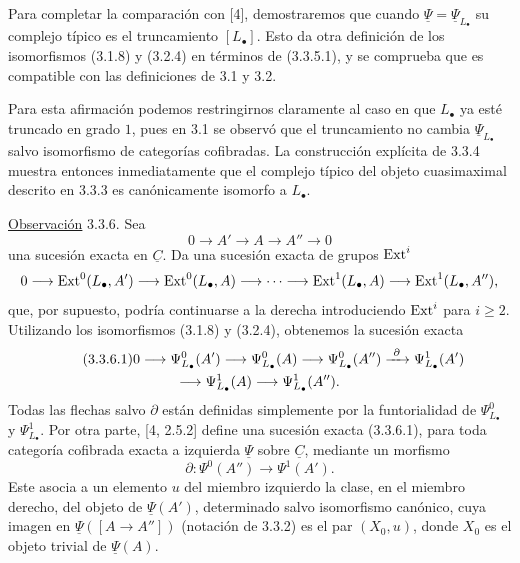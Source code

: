 Para completar la comparación con [4], demostraremos que cuando
$\underline\Psi=\underline\Psi_{L_\bullet}$ su complejo típico es el
truncamiento $[L_\bullet]$. Esto da otra definición de los
isomorfismos (3.1.8) y (3.2.4) en términos de (3.3.5.1), y se comprueba
que es compatible con las definiciones de 3.1 y 3.2.

Para esta afirmación podemos restringirnos claramente al caso en que
$L_\bullet$ ya esté truncado en grado $1$, pues en 3.1 se observó que
el truncamiento no cambia $\underline\Psi_{L_\bullet}$ salvo
isomorfismo de categorías cofibradas. La construcción explícita de
3.3.4 muestra entonces inmediatamente que el complejo típico del
objeto cuasimaximal descrito en 3.3.3 es canónicamente isomorfo a
$L_\bullet$.

\underline{Observación} 3.3.6. Sea
\[
 0\longrightarrow A'\longrightarrow A\longrightarrow A''
 \longrightarrow0
\]
una sucesión exacta en $\underline C$. Da una sucesión exacta de
grupos $\Ext^i$
\[
 0\longrightarrow\Ext^0(L_\bullet,A')
 \longrightarrow\Ext^0(L_\bullet,A)
 \longrightarrow\cdots\longrightarrow\Ext^1(L_\bullet,A)
 \longrightarrow\Ext^1(L_\bullet,A''),
\]
que, por supuesto, podría continuarse a la derecha introduciendo
$\Ext^i$ para $i\geq2$. Utilizando los isomorfismos (3.1.8) y (3.2.4),
obtenemos la sucesión exacta
\begin{multline}\tag{3.3.6.1}
 0\longrightarrow\Psi^0_{L_\bullet}(A')
 \longrightarrow\Psi^0_{L_\bullet}(A)
 \longrightarrow\Psi^0_{L_\bullet}(A'')
 \xrightarrow{\ \sisi{o}{\partial}\ }\Psi^1_{L_\bullet}(A')\\
 \longrightarrow\Psi^1_{L_\bullet}(A)
 \longrightarrow\Psi^1_{L_\bullet}(A'').
\end{multline}
Todas las flechas salvo $\partial$ están definidas simplemente por la
funtorialidad de $\Psi^0_{L_\bullet}$ y $\Psi^1_{L_\bullet}$. Por otra
parte, [4, 2.5.2] define una sucesión exacta (3.3.6.1), para toda
categoría cofibrada exacta a izquierda $\underline\Psi$ sobre
$\underline C$, mediante un morfismo
\begin{equation}\tag{3.3.6.2}
 \partial:\Psi^0(A'')\longrightarrow\Psi^1(A').
\end{equation}
Este asocia a un elemento $u$ del miembro izquierdo la clase, en el
miembro derecho, del objeto de $\underline\Psi(A')$, determinado salvo
isomorfismo canónico, cuya imagen en
$\underline\Psi([A\longrightarrow A''])$ (notación de 3.3.2) es el
par $(X_0,u)$, donde $X_0$ es el objeto trivial de
$\underline\Psi(A)$.

